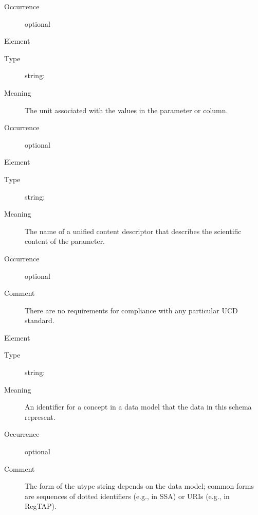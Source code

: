 \documentclass[11pt,a4paper]{ivoa}
\begin{document}
\begin{generated}
\begin{bigdescription}
\begin{description}
\item[Occurrence] optional

\end{description}
\item[Element \xmlel{unit}]
\begin{description}
\item[Type] string: 
\item[Meaning] 
                  The unit associated with the values in the parameter
                  or column.
               
\item[Occurrence] optional

\end{description}
\item[Element \xmlel{ucd}]
\begin{description}
\item[Type] string: 
\item[Meaning] 
                  The name of a unified content descriptor that
                  describes the scientific content of the parameter.
               
\item[Occurrence] optional
\item[Comment] 
                  There are no requirements for compliance with any 
                  particular UCD standard.
               

\end{description}
\item[Element \xmlel{utype}]
\begin{description}
\item[Type] string: 
\item[Meaning] 
                  An identifier for a concept in a data model that
                  the data in this schema represent.  
               
\item[Occurrence] optional
\item[Comment] 
                  The form of the utype string depends on the data
                  model; common forms are sequences of dotted identifiers
                  (e.g., in SSA) or URIs (e.g., in RegTAP).
               

\end{description}


\end{bigdescription}\endgroup

\endgroup
\end{generated}
\end{document}
